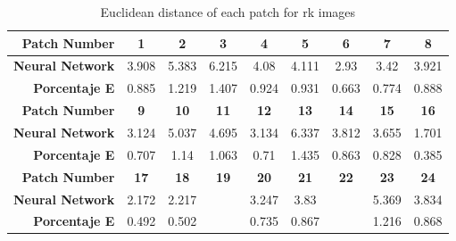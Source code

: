 \begin{table}[H]
  \caption{Euclidean distance of each patch for rk images }
  \begin{center}
    \begin{tabularx}{\textwidth}{r c c c c c c c c}
    \toprule
        \textbf{Patch Number} & \textbf{1} & \textbf{2} & \textbf{3} & \textbf{4} & \textbf{5} & \textbf{6} & \textbf{7} & \textbf{8}\\ \midrule 
        \textbf{Neural Network} &3.908 &5.383 &6.215 &4.08 &4.111 &2.93 &3.42 &3.921\\ 
        \textbf{Porcentaje E} &0.885 &1.219 &1.407 &0.924 &0.931 &0.663 &0.774 &0.888\\ \midrule 
        \textbf{Patch Number} & \textbf{9} & \textbf{10} & \textbf{11} & \textbf{12} & \textbf{13} & \textbf{14} & \textbf{15} & \textbf{16}\\ \midrule 
        \textbf{Neural Network} &3.124 &5.037 &4.695 &3.134 &6.337 &3.812 &3.655 &1.701\\ 
        \textbf{Porcentaje E} &0.707 &1.14 &1.063 &0.71 &1.435 &0.863 &0.828 &0.385\\ \midrule 
        \textbf{Patch Number} & \textbf{17} & \textbf{18} & \textbf{19} & \textbf{20} & \textbf{21} & \textbf{22} & \textbf{23} & \textbf{24}\\ \midrule 
        \textbf{Neural Network} &2.172 &2.217 &\cellcolor{colorgreen}{1.098} &3.247 &3.83 &\cellcolor{colorred}{6.565} &5.369 &3.834\\ 
        \textbf{Porcentaje E} &0.492 &0.502 &\cellcolor{colorgreen}{0.249} &0.735 &0.867 &\cellcolor{colorred}{1.486} &1.216 &0.868\\ \midrule 
    \bottomrule
    \end{tabularx}
  \end{center}
\end{table}
